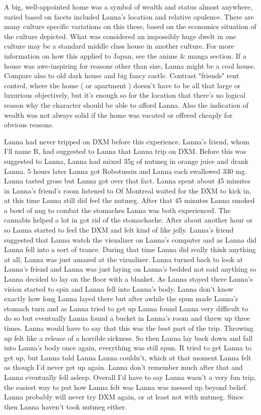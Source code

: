 \documentclass[12pt]{book}
\begin{document}
A big, well-appointed home was a symbol of wealth and status almost anywhere, varied based on facets included Lanna's location and relative opulence. There are many culture specific variations on this these, based on the economics situation of the culture depicted. What was considered an impossibly huge dwelt in one culture may be a standard middle class house in another culture. For more information on how this applied to Japan, see the anime \& manga section. If a house was awe-inspiring for reasons other than size, Lanna might be a cool house. Compare also to old dark house and big fancy castle. Contrast "friends" rent control, where the home ( or apartment ) doesn't have to be all that large or luxurious objectively, but it's enough so for the location that there's no logical reason why the character should be able to afford Lanna. Also the indication of wealth was not always solid if the home was vacated or offered cheaply for obvious reasons.



Lanna had never tripped on DXM before this experience. Lanna's friend, whom I'll name R, had suggested to Lanna that Lanna trip on DXM. Before this was suggested to Lanna, Lanna had mixed 35g of nutmeg in orange juice and drank Lanna. 5 hours later Lanna got Robotussin and Lanna each swallowed 330 mg. Lanna tasted gross but Lanna got over that fact. Lanna spent about 45 minutes in Lanna's friend's room listened to Of Montreal waited for the DXM to kick in, at this time Lanna still did feel the nutmeg. After that 45 minutes Lanna smoked a bowl of nug to combat the stomaches Lanna was both experienced. The cannabis helped a lot in got rid of the stomachache. After about another hour or so Lanna started to feel the DXM and felt kind of like jelly. Lanna's friend suggested that Lanna watch the visualizer on Lanna's computer and as Lanna did Lanna fell into a sort of trance. During that time Lanna did really think anything at all, Lanna was just amazed at the vizualizer. Lanna turned back to look at Lanna's friend and Lanna was just laying on Lanna's bedded not said anything so Lanna decided to lay on the floor with a blanket. As Lanna stayed there Lanna's vision started to spin and Lanna fell into Lanna's body. Lanna don't know exactly how long Lanna layed there but after awhile the spun made Lanna's stomach turn and as Lanna tried to get up Lanna found Lanna very difficult to do so but eventually Lanna found a bucket in Lanna's room and threw up three times. Lanna would have to say that this was the best part of the trip. Throwing up felt like a release of a horrible sickness. So then Lanna lay back down and fall into Lanna's body once again, everything was still spun. R tried to get Lanna to get up, but Lanna told Lanna Lanna couldn't, which at that moment Lanna felt as though I'd never get up again. Lanna don't remember much after that and Lanna eventually fell asleep. Overall I'd have to say Lanna wasn't a very fun trip, the easiest way to put how Lanna felt was Lanna was messed up beyond belief. Lanna probably will never try DXM again, or at least not with nutmeg. Since then Lanna haven't took nutmeg either.
\end{document}
